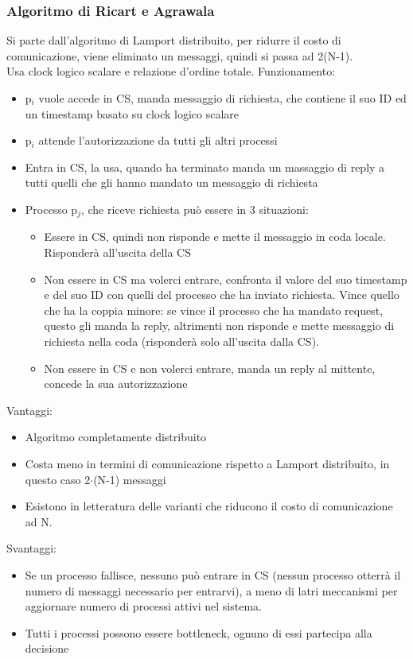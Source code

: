 \documentclass{article}
\begin{document}
\subsubsection{Algoritmo di Ricart e Agrawala}
Si parte dall'algoritmo di Lamport distribuito, per ridurre il costo di comunicazione, viene eliminato un messaggi, quindi si passa ad 2(N-1).\\ Usa clock logico scalare e relazione d'ordine totale. Funzionamento:
\begin{itemize}
\item p$_i$ vuole accede in CS, manda messaggio di richiesta, che contiene il suo ID ed un timestamp basato su clock logico scalare
\item p$_i$ attende l'autorizzazione da tutti gli altri processi
\item Entra in CS, la usa, quando ha terminato manda un massaggio di reply a tutti quelli che gli hanno mandato un messaggio di richiesta
\item Processo p$_j$, che riceve richiesta può essere in 3 situazioni:
\begin{itemize}
\item Essere in CS, quindi non risponde e mette il messaggio in coda locale. Risponderà all'uscita della CS
\item Non essere in CS ma volerci entrare, confronta il valore del suo timestamp e del suo ID con quelli del processo che ha inviato richiesta. Vince quello che ha la coppia minore: se vince il processo che ha mandato request, questo gli manda la reply, altrimenti non risponde e mette messaggio di richiesta nella coda (risponderà solo all'uscita dalla CS).
\item Non essere in CS e non volerci entrare, manda un reply al mittente, concede la sua autorizzazione
\end{itemize}
\end{itemize}
Vantaggi:
\begin{itemize}
\item Algoritmo completamente distribuito
\item Costa meno in termini di comunicazione rispetto a Lamport distribuito, in questo caso 2$\cdot$(N-1) messaggi
\item Esistono in letteratura delle varianti che riducono il costo di comunicazione ad N.
\end{itemize}
Svantaggi:
\begin{itemize}
\item Se un processo fallisce, nessuno può entrare in CS (nessun processo otterrà il numero di messaggi necessario per entrarvi), a meno di latri meccanismi per aggiornare numero di processi attivi nel sistema.
\item Tutti i processi possono essere bottleneck, ognuno di essi partecipa alla decisione
\end{itemize}
\end{document}

